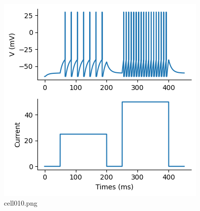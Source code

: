 \begin{figure}[ht]
	\centering
	\includegraphics[scale=0.8, max width=\linewidth]{./fig/neuron-model/lif/cell010.png}
	\caption{cell010.png}
	\label{cell010.png}
\end{figure}